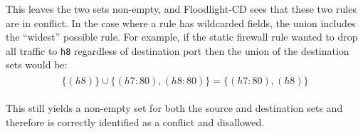 This leaves the two sets non-empty, and Floodlight-CD sees that these two rules are in conflict.
In the case where a rule has wildcarded fields, the union includes the ``widest'' possible rule.
For example, if the static firewall rule wanted to drop all traffic to \texttt{h8} regardless of destination port then the union of the destination sets would be:
\begin{align}
\begin{aligned}
\{(h8)\} \cup \{(h7:80),(h8:80)\} =  \{(h7:80),(h8)\} \nonumber
\end{aligned}
\end{align}

This still yields a non-empty set for both the source and destination sets and therefore is correctly identified as a conflict and disallowed.


